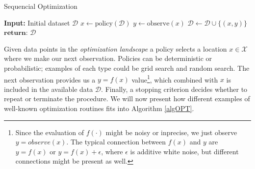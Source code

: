 \begin{algorithm}[H]
\caption{Sequencial Optimization \cite{bayesoptbook} }\label{algOPT}
\begin{algorithmic}
\State \textbf{Input:} Initial dataset $\mathcal{D}$  
    \State $x \gets \text{policy}(\mathcal{D})$ 
    \State $y \gets \text{observe}(x)$ 
    \State $\mathcal{D} \gets \mathcal{D} \cup \{(x,y)\} $ 
\EndWhile
\State $\textbf{return: } \mathcal{D}$
\end{algorithmic}
\end{algorithm}

Given data points in the \textit{optimization landscape}
a policy selects a location $x
\in \mathcal{X}$ where we make our next observation. Policies can be deterministic or probabilistic;
examples of each type could be grid search and random search. The next observation provides us a $y = f(x)$
value\footnote{Since the evaluation of $f(\cdot)$ might be noisy or inprecise, we just observe $y = observe(x)$. The typical
connection between $f(x)$ and $y$ are $y = f(x)$ or $y = f(x) + \epsilon$, where $\epsilon$ is additive white noise, 
but different connections might be present as well.}, which combined with $x$ is included in the available data $\mathcal{D}$. Finally, a stopping
criterion decides whether to repeat or terminate the procedure. We will now present how different
examples of well-known optimization routines fits into Algorithm \ref{algOPT}.


